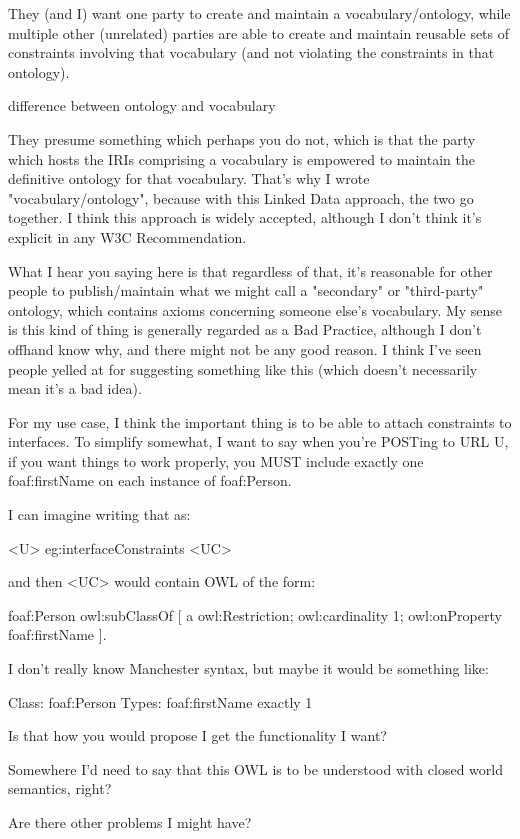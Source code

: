 \documentclass{llncs}
\begin{document}
They (and I) want one party to create and maintain a
vocabulary/ontology, while multiple other (unrelated) parties are able
to create and maintain reusable sets of constraints involving that
vocabulary (and not violating the constraints in that ontology).
 
difference between ontology and vocabulary

They presume something which perhaps you do not, which is that the
party which hosts the IRIs comprising a vocabulary is empowered to
maintain the definitive ontology for that vocabulary.  That's why I
wrote "vocabulary/ontology", because with this Linked Data approach, the
two go together.  I think this approach is widely accepted, although I
don't think it's explicit in any W3C Recommendation. 
 
What I hear you saying here is that regardless of that, it's reasonable
for other people to publish/maintain what we might call a "secondary" or
"third-party" ontology, which contains axioms concerning someone else's
vocabulary.    My sense is this kind of thing is generally regarded as a
Bad Practice, although I don't offhand know why, and there might not be
any good reason.  I think I've seen people yelled at for suggesting
something like this (which doesn't necessarily mean it's a bad idea).
 
For my use case, I think the important thing is to be able to attach
constraints to interfaces.  To simplify somewhat, I want to say when
you're POSTing to URL U, if you want things to work properly, you MUST
include exactly one foaf:firstName on each instance of foaf:Person.
 
I can imagine writing that as:
 
    <U> eg:interfaceConstraints <UC>
 
and then <UC> would contain OWL of the form:
 
    foaf:Person owl:subClassOf [
       a owl:Restriction;
       owl:cardinality 1;
       owl:onProperty foaf:firstName
    ].
 
I don't really know Manchester syntax, but maybe it would be something like:
 
    Class: foaf:Person
       Types: foaf:firstName exactly 1
 
Is that how you would propose I get the functionality I want?
 
Somewhere I'd need to say that this OWL is to be understood with closed
world semantics, right?
 
Are there other problems I might have?
 
\end{document}

